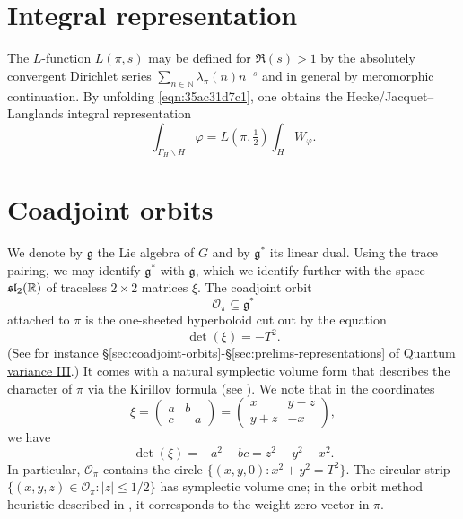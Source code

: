 \documentclass[reqno]{amsart} 
\numberwithin{equation}{section}
\begin{document}
\section{Integral representation}\label{sec:org8f5cc20}
The $L$-function $L(\pi,s)$ may be defined for $\Re(s) > 1$ by the absolutely convergent Dirichlet series $\sum_{n \in \mathbb{N} } \lambda_\pi(n) n^{-s}$ and in general by meromorphic continuation.  By unfolding \eqref{eqn:35ac31d7c1}, one obtains the Hecke/Jacquet--Langlands integral representation
\begin{equation}\label{eq:int-_h-varphi}
  \int _{\Gamma_{H} \backslash H} \varphi = L(\pi,\tfrac{1}{2}) \int _H W_\varphi.
\end{equation}


\section{Coadjoint orbits}\label{sec:orge4ffe7c}
We denote by $\mathfrak{g}$ the Lie algebra of $G$ and by $\mathfrak{g}^*$ its linear dual.  Using the trace pairing, we may identify $\mathfrak{g}^*$ with $\mathfrak{g}$, which we identify further with the space $\operatorname{\mathfrak{s}\mathfrak{l}}_2(\mathbb{R})$ of traceless $2 \times 2$ matrices $\xi$.  The coadjoint orbit
\begin{equation*}
  \mathcal{O}_\pi \subseteq \mathfrak{g}^*
\end{equation*}
attached to $\pi$ is the one-sheeted hyperboloid cut out by the equation
\begin{equation*}
  \det(\xi) = -T^2.
\end{equation*}
(See for instance \S\ref{sec:coadjoint-orbits}-\S\ref{sec:prelims-representations} of \href{var-quat-3-submitted.pdf}{Quantum variance III}.) It comes with a natural symplectic volume form that describes the character of $\pi$ via the Kirillov formula (see \cite[\S6]{nelson-venkatesh-1}).  We note that in the coordinates
\begin{equation*}
  \xi =
  \begin{pmatrix}
    a & b \\
    c & -a
  \end{pmatrix}
  =
  \begin{pmatrix}
  x & y - z \\
  y + z & -x
\end{pmatrix},
\end{equation*}
we have
\begin{equation*}
  \det(\xi) = -a^2 - b c = z^2 - y^2 - x^2.
\end{equation*}
In particular, $\mathcal{O}_\pi$ contains the circle $\{(x,y,0) : x^2 + y^2 = T^2\}$.  The circular strip $\{(x,y,z) \in \mathcal{O}_\pi : |z| \leq 1/2\}$ has symplectic volume one; in the orbit method heuristic described in \cite[\S1.7]{nelson-venkatesh-1}, it corresponds to the weight zero vector in $\pi$.
\end{document}
